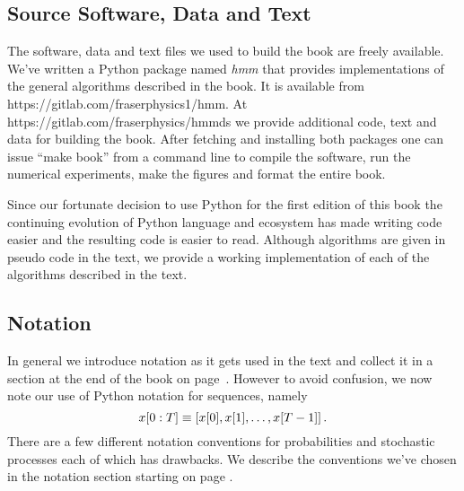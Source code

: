 \documentclass[ltxbook,showlabels, commentsvisible]{hmmdsbook}
\begin{document}

\subsection*{Source Software, Data and Text}
\label{preface_software}

The software, data and text files we used to build the book are freely
available.  We've written a Python package named \emph{hmm} that
provides implementations of the general algorithms described in the
book.  It is available from https://gitlab.com/fraserphysics1/hmm.  At
https://gitlab.com/fraserphysics/hmmds we provide additional code,
text and data for building the book.  After fetching and installing
both packages one can issue ``make book'' from a command line to
compile the software, run the numerical experiments, make the figures
and format the entire book.  

Since our fortunate decision to use Python for the first edition of
this book the continuing evolution of Python language and ecosystem
has made writing code easier and the resulting code is easier to read.
Although algorithms are given in pseudo code in the text, we provide a
working implementation of each of the algorithms described in the
text.

\subsection*{Notation}
\label{preface_notation}

In general we introduce notation as it gets used in the text and
collect it in a section at the end of the book on page~\pageref{sec:notation}.  However to avoid confusion, we now note our
use of Python notation for sequences, namely
\begin{equation*}
  x[0:T] \equiv \left[ x[0], x[1], \ldots, x[T-1] \right].
\end{equation*}
There are a few different notation conventions for probabilities and
stochastic processes each of which has drawbacks.  We describe the
conventions we've chosen in the notation section starting on page
\pageref{sec:notation}.
\end{document}
